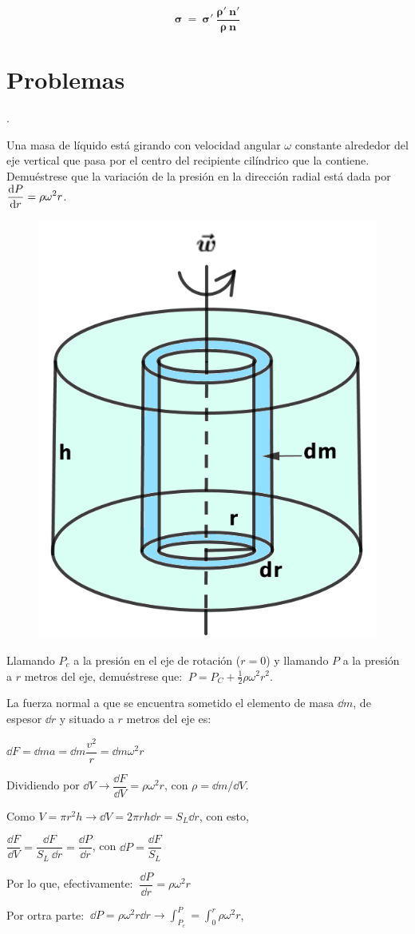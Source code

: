 $$\boldsymbol{ \sigma\ = \ \sigma' \ \dfrac{\rho'\ n'}{\rho\ n} }$$

\section{Problemas}
\begin{prob}.

\begin{multicols}{2}
	Una masa de líquido está girando con velocidad angular $\omega$ constante alrededor del eje vertical que pasa por el centro del recipiente cilíndrico que la contiene. Demuéstrese que la variación de la presión en la dirección radial está dada por $\displaystyle \dv{P}{r}=\rho \omega^2 r$.
\begin{figure}[H]
	\centering
	\includegraphics[width=.25\textwidth]{imagenes/imagenes08/T08IM20.png}
\end{figure}
\end{multicols}

\vspace{-4mm} %
Llamando $P_c$ a la presión en el eje de rotación ($r=0$) y llamando $P$ a la presión a $r$ metros del eje, demuéstrese que: $\ P=P_C+\frac 1 2 \rho \omega^2 r^2$.
\end{prob}


La fuerza normal a que se encuentra sometido el elemento de masa $\dd m$, de espesor $\dd r$ y situado a $r$ metros del eje es:

$\dd F= \dd m a = \dd m \dfrac {v^2}{r}=\dd m \omega^2 r$

Dividiendo por $\dd V \to  \dfrac{\dd F}{\dd V}=\rho \omega^2 r$, con $\rho=\dd m / \dd V$.

Como $V=\pi r^2 h \to \dd V= 2 \pi r h \dd r=S_L \dd r$, con esto,

$\dfrac {\dd F}{\dd V}=\dfrac{\dd F}{S_L \ \dd r}=\dfrac{\dd P}{\dd r}$, con $\dd P=\dfrac{\dd F}{S_L}$

Por lo que, efectivamente: $\ \dfrac{\dd P}{\dd r}=\rho \omega^2 r$

Por ortra parte: $\ \displaystyle \dd P = \rho \omega^2 r \dd r \to \int_{P_c}^P=\int_{0}^r \rho \omega^2 r$, 

